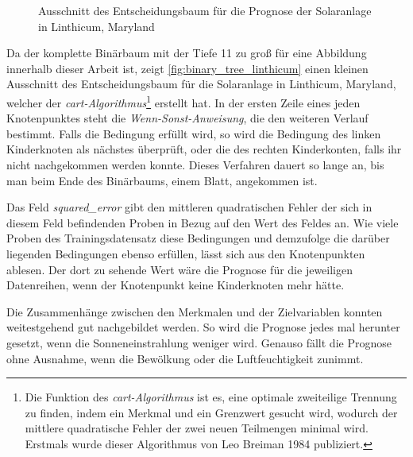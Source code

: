 \documentclass[12pt, a4paper]{article}
\begin{document}
\begin{figure}
\centering
\def\svgwidth{425pt}

\caption{Ausschnitt des Entscheidungsbaum für die Prognose der Solaranlage in Linthicum, Maryland}
\label{fig:binary_tree_linthicum}
\end {figure}

Da der komplette Binärbaum mit der Tiefe 11 zu groß für eine Abbildung innerhalb dieser Arbeit ist, zeigt \autoref{fig:binary_tree_linthicum} einen kleinen Ausschnitt des Entscheidungsbaum für die Solaranlage in Linthicum, Maryland, welcher der \textit{\ac{cart}-Algorithmus}\footnote{Die Funktion des \textit{\ac{cart}-Algorithmus} ist es, eine optimale zweiteilige Trennung zu finden, indem ein Merkmal und ein Grenzwert gesucht wird, wodurch der mittlere quadratische Fehler der zwei neuen Teilmengen minimal wird. Erstmals wurde dieser Algorithmus von Leo Breiman 1984 publiziert.} erstellt hat. In der ersten Zeile eines jeden Knotenpunktes steht die \textit{Wenn-Sonst-Anweisung}, die den weiteren Verlauf bestimmt. Falls die Bedingung erfüllt wird, so wird die Bedingung des linken Kinderknoten als nächstes überprüft, oder die des rechten Kinderkonten, falls ihr nicht nachgekommen werden konnte. Dieses Verfahren dauert so lange an, bis man beim Ende des Binärbaums, einem Blatt, angekommen ist.

Das Feld \textit{squared\_error} gibt den mittleren quadratischen Fehler der sich in diesem Feld befindenden Proben in Bezug auf den Wert des Feldes an. Wie viele Proben des Trainingsdatensatz diese Bedingungen und demzufolge die darüber liegenden Bedingungen ebenso erfüllen, lässt sich aus den Knotenpunkten ablesen. Der dort zu sehende Wert wäre die Prognose für die jeweiligen Datenreihen, wenn der Knotenpunkt keine Kinderknoten mehr hätte.

Die Zusammenhänge zwischen den Merkmalen und der Zielvariablen konnten weitestgehend gut nachgebildet werden. So wird die Prognose jedes mal herunter gesetzt, wenn die Sonneneinstrahlung weniger wird. Genauso fällt die Prognose ohne Ausnahme, wenn die Bewölkung oder die Luftfeuchtigkeit zunimmt. 
\end{document}
